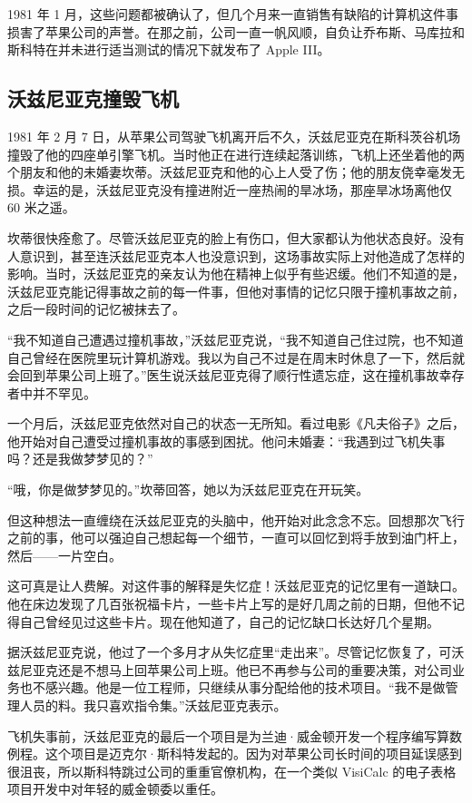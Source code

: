 \documentclass[12pt,UTF8]{ctexbook}
\begin{document}
1981 年 1 月，这些问题都被确认了，但几个月来一直销售有缺陷的计算机这件事损害了苹果公司的声誉。在那之前，公司一直一帆风顺，自负让乔布斯、马库拉和斯科特在并未进行适当测试的情况下就发布了 Apple III。





\subsection{沃兹尼亚克撞毁飞机}


1981 年 2 月 7 日，从苹果公司驾驶飞机离开后不久，沃兹尼亚克在斯科茨谷机场撞毁了他的四座单引擎飞机。当时他正在进行连续起落训练，飞机上还坐着他的两个朋友和他的未婚妻坎蒂。沃兹尼亚克和他的心上人受了伤；他的朋友侥幸毫发无损。幸运的是，沃兹尼亚克没有撞进附近一座热闹的旱冰场，那座旱冰场离他仅 60 米之遥。

坎蒂很快痊愈了。尽管沃兹尼亚克的脸上有伤口，但大家都认为他状态良好。没有人意识到，甚至连沃兹尼亚克本人也没意识到，这场事故实际上对他造成了怎样的影响。当时，沃兹尼亚克的亲友认为他在精神上似乎有些迟缓。他们不知道的是，沃兹尼亚克能记得事故之前的每一件事，但他对事情的记忆只限于撞机事故之前，之后一段时间的记忆被抹去了。

“我不知道自己遭遇过撞机事故，”沃兹尼亚克说，“我不知道自己住过院，也不知道自己曾经在医院里玩计算机游戏。我以为自己不过是在周末时休息了一下，然后就会回到苹果公司上班了。”医生说沃兹尼亚克得了顺行性遗忘症，这在撞机事故幸存者中并不罕见。

一个月后，沃兹尼亚克依然对自己的状态一无所知。看过电影《凡夫俗子》之后，他开始对自己遭受过撞机事故的事感到困扰。他问未婚妻：“我遇到过飞机失事吗？还是我做梦梦见的？”

“哦，你是做梦梦见的。”坎蒂回答，她以为沃兹尼亚克在开玩笑。

但这种想法一直缠绕在沃兹尼亚克的头脑中，他开始对此念念不忘。回想那次飞行之前的事，他可以强迫自己想起每一个细节，一直可以回忆到将手放到油门杆上，然后——一片空白。

这可真是让人费解。对这件事的解释是失忆症！沃兹尼亚克的记忆里有一道缺口。他在床边发现了几百张祝福卡片，一些卡片上写的是好几周之前的日期，但他不记得自己曾经见过这些卡片。现在他知道了，自己的记忆缺口长达好几个星期。

据沃兹尼亚克说，他过了一个多月才从失忆症里“走出来”。尽管记忆恢复了，可沃兹尼亚克还是不想马上回苹果公司上班。他已不再参与公司的重要决策，对公司业务也不感兴趣。他是一位工程师，只继续从事分配给他的技术项目。“我不是做管理人员的料。我只喜欢指令集。”沃兹尼亚克表示。

飞机失事前，沃兹尼亚克的最后一个项目是为兰迪·威金顿开发一个程序编写算数例程。这个项目是迈克尔·斯科特发起的。因为对苹果公司长时间的项目延误感到很沮丧，所以斯科特跳过公司的重重官僚机构，在一个类似 VisiCalc 的电子表格项目开发中对年轻的威金顿委以重任。
\end{document}
